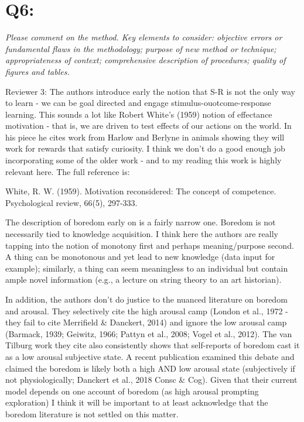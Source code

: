 \documentclass[utf8]{article}
\begin{document}
    \section*{Q6:}
        \textit{Please comment on the method. Key elements to consider: objective errors or fundamental flaws in the methodology; purpose of new method or technique; appropriateness of context; comprehensive description of procedures; quality of figures and tables.}\newline
        
        Reviewer 3:
        The authors introduce early the notion that S-R is not the only way to learn - we can be goal directed and engage stimulus-ouotcome-response learning. This sounds a lot like Robert White's (1959) notion of effectance motivation - that is, we are driven to test effects of our actions on the world. In his piece he cites work from Harlow and Berlyne in animals showing they will work for rewards that satisfy curiosity. I think we don't do a good enough job incorporating some of the older work - and to my reading this work is highly relevant here. The full reference is:
        
        White, R. W. (1959). Motivation reconsidered: The concept of competence. Psychological review, 66(5), 297-333.
         
        The description of boredom early on is a fairly narrow one. Boredom is not necessarily tied to knowledge acquisition. I think here the authors are really tapping into the notion of monotony first and perhaps meaning/purpose second. A thing can be monotonous and yet lead to new knowledge (data input for example); similarly, a thing can seem meaningless to an individual but contain ample novel information (e.g., a lecture on string theory to an art historian). 
        
        In addition, the authors don't do justice to the nuanced literature on boredom and arousal. They selectively cite the high arousal camp (London et al., 1972 - they fail to cite Merrifield \& Danckert, 2014) and ignore the low arousal camp (Barmack, 1939; Geiwitz, 1966; Pattyn et al., 2008; Vogel et al., 2012). The van Tilburg work they cite also consistently shows that self-reports of boredom cast it as a low arousal subjective state. A recent publication examined this debate and claimed the boredom is likely both a high AND low arousal state (subjectively if not physiologically; Danckert et al., 2018 Consc \& Cog). Given that their current model depends on one account of boredom (as high arousal prompting exploration) I think it will be important to at least acknowledge that the boredom literature is not settled on this matter.
        
\end{document}
